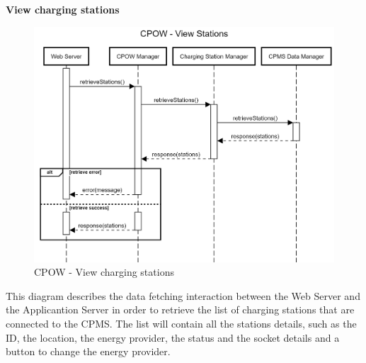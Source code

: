 \documentclass[table, 12pt]{article}
\begin{document}
\textbf{View charging stations}
\begin{center}
    \begin{figure}[H]
        \includegraphics[scale=0.25, center]{assets/sequenceDiagrams/CPOW view stations.png}
        \caption{CPOW - View charging stations}
        \label{CPOW - View charging stations}
    \end{figure}
\end{center}
This diagram describes the data fetching interaction between the Web Server and the Applicantion Server in order to retrieve the list of charging stations that are connected to the CPMS.
The list will contain all the stations details, such as the ID, the location, the energy provider, the status and the socket details and a button to change the energy provider.
\newpage
\end{document}
